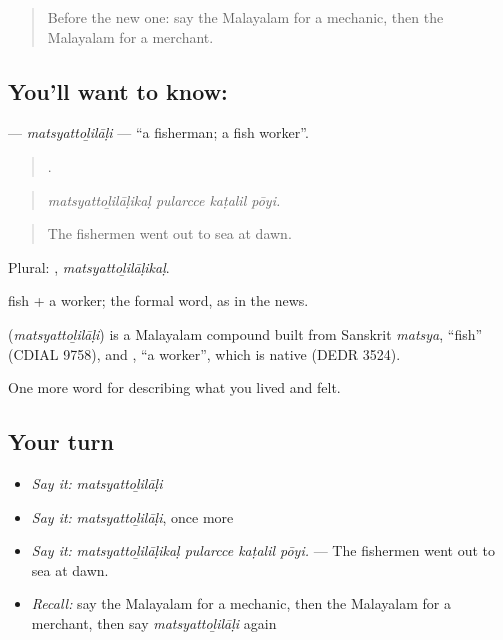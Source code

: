 \label{lesson:ML-C548-matsyattolilali}



\begin{quote}
Before the new one: say the Malayalam for a mechanic, then the Malayalam for a merchant.
\end{quote}

\subsection*{You'll want to know: }
\textbf{} — \emph{matsyattoḻilāḷi} — \textquotedblleft{}a fisherman; a fish worker\textquotedblright{}.

\begin{quote}
   .
\end{quote}

\begin{quote}
\emph{matsyattoḻilāḷikaḷ pularcce kaṭalil pōyi.}
\end{quote}

\begin{quote}
The fishermen went out to sea at dawn.
\end{quote}

Plural: , \emph{matsyattoḻilāḷikaḷ}.

 fish +  a worker; the formal word, as in the news.

\begin{cousinweb}
\textbf{} (\emph{matsyattoḻilāḷi}) is a Malayalam compound built from Sanskrit \emph{matsya}, \textquotedblleft{}fish\textquotedblright{} (CDIAL 9758), and , \textquotedblleft{}a worker\textquotedblright{}, which is native (DEDR 3524).
\end{cousinweb}

\begin{grammarlens}[title={What you've built}]
One more word for describing what you lived and felt.
\end{grammarlens}

\subsection*{Your turn}
\begin{itemize}
\raggedright
  \item \emph{Say it:} \emph{matsyattoḻilāḷi}
  \item \emph{Say it:} \emph{matsyattoḻilāḷi}, once more
  \item \emph{Say it:} \emph{matsyattoḻilāḷikaḷ pularcce kaṭalil pōyi.} — The fishermen went out to sea at dawn.
  \item \emph{Recall:} say the Malayalam for a mechanic, then the Malayalam for a merchant, then say \emph{matsyattoḻilāḷi} again
\end{itemize}

